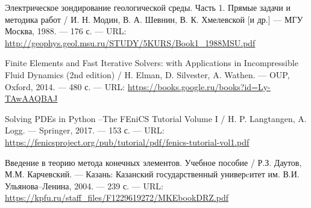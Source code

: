 \begingroup 
\renewcommand{\section}[2]{\anonsection{Библиографический список}}
\begin{thebibliography}{00}

    Электрическое зондирование геологической среды. Часть 1. Прямые задачи и методика работ /
    И. Н. Модин, В. А. Шевнин, В. К. Хмелевской [и др.]
    --- МГУ Москва, 1988.
    --- 176 с.
    --- URL: \url{http://geophys.geol.msu.ru/STUDY/5KURS/Book1_1988MSU.pdf}
   
    Finite Elements and Fast Iterative Solvers: with Applications in Incompressible Fluid Dynamics (2nd edition) /
    H. Elman, D. Silvester, A. Wathen.
    --- OUP, Oxford, 2014. 
    --- 480 с.
    --- URL: \url{https://books.google.ru/books?id=Ly-TAwAAQBAJ}

    Solving PDEs in Python --The FEniCS Tutorial Volume I /
    H. P. Langtangen, A. Logg.
    --- Springer, 2017.
    --- 153 с.
    --- URL: \url{https://fenicsproject.org/pub/tutorial/pdf/fenics-tutorial-vol1.pdf}

    Введение в теорию метода конечных элементов. Учебное пособие /
    Р.З. Даутов, М.М. Карчевский.
    — Казань: Казанский государственный универcитет им. В.И. Ульянова–Ленина, 2004.
    — 239 с.
    --- URL: \url{https://kpfu.ru/staff_files/F1229619272/MKEbookDRZ.pdf}
\end{thebibliography}
\endgroup

\clearpage
